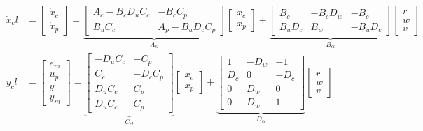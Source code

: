 \documentclass[letterpaper,12pt]{article}
\begin{document}
\begin{align*}
    \dot{x}_cl &= \begin{bmatrix}
        \dot{x}_c \\
        \dot{x}_p
    \end{bmatrix} = \underbrace{
    \begin{bmatrix}
    A_c - B_c D_u C_c & -B_c C_p \\
    B_u C_c & A_p - B_u D_c C_p
    \end{bmatrix}}_{A_{cl}}
    \begin{bmatrix}
        x_c \\
        x_p
    \end{bmatrix} + \underbrace{
    \begin{bmatrix}
        B_c & -B_c D_w & -B_c \\
        B_u D_c & B_w & -B_u D_c
    \end{bmatrix}}_{B_{cl}}
    \begin{bmatrix}
        r \\
        w \\
        v 
    \end{bmatrix} \\
    y_cl &= \begin{bmatrix}
        e_m \\
        u_p \\
        y  \\
        y_m 
    \end{bmatrix} = \underbrace{
    \begin{bmatrix}
        -D_u C_c & -C_p \\
        C_c & -D_c C_p \\
        D_u C_c & C_p \\
        D_u C_c & C_p 
    \end{bmatrix}}_{C_{cl}}
    \begin{bmatrix}
        x_c \\
        x_p
    \end{bmatrix} + \underbrace{
    \begin{bmatrix}
        1 & -D_w & -1 \\
        D_c & 0 & -D_c \\
        0 & D_w & 0 \\
        0 & D_w & 1
    \end{bmatrix}}_{D_{cl}}
    \begin{bmatrix}
        r \\
        w \\
        v
    \end{bmatrix}
\end{align*}
\end{document}
